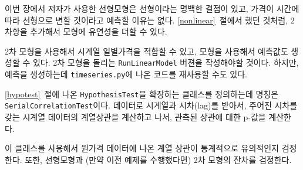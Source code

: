 \begin{exercise}
이번 장에서 저자가 사용한 선형모형은 선형이라는 명백한 결점이 있고,
가격이 시간에 따라 선형으로 변할 것이라고 예측할 이유는 없다.
\ref{nonlinear}~절에서 했던 것처럼, 2차항을 추가해서 모형에 유연성을 더할 수 있다.


2차 모형을 사용해서 시계열 일별가격을 적합할 수 있고,
모형을 사용해서 예측값도 생성할 수 있다.
2차 모형을 돌리는 {\tt RunLinearModel} 버젼을 작성해야할 것이다.
하지만, 예측을 생성하는데 {\tt timeseries.py}에 나온 코드를 재사용할 수도 있다.


\end{exercise}

\begin{exercise}

\ref{hypotest}~절에 나온 {\tt HypothesisTest}을 확장하는 
클래스를 정의하는데 명칭은 {\tt SerialCorrelationTest}이다.
데이터로 시계열과 시차(lag)를 받아서, 주어진 시차를 갖는 
시계열 데이터의 계열상관을 계산하고 나서,
관측된 상관에 대한 p-값을 계산한다.


이 클래스를 사용해서 원가격 데이터에 나온 계열 상관이 통계적으로 유의적인지 검정한다.
또한, 선형모형과 (만약 이전 예제를 수행했다면) 2차 모형의 잔차를 검정한다.
   

\end{exercise}


